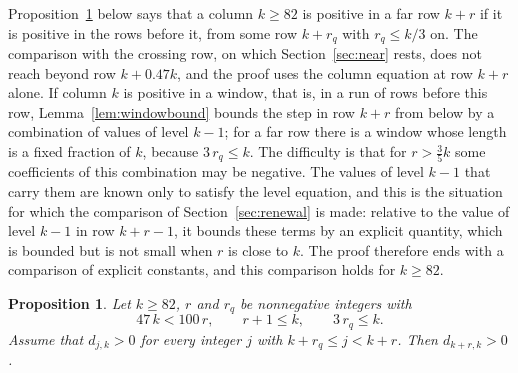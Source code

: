 \documentclass{amsart}
\newtheorem{proposition}[theorem]{Proposition}
\theoremstyle{definition}
\theoremstyle{remark}
\numberwithin{equation}{section}
\begin{document}
Proposition~\ref{prop:farrows} below says that a column $k\ge 82$ is positive in a far row $k+r$ if it is positive in the rows before it, from some row $k+r_q$ with $r_q\le k/3$ on. The comparison with the crossing row, on which Section~\ref{sec:near} rests, does not reach beyond row $k+0.47k$, and the proof uses the column equation at row $k+r$ alone. If column $k$ is positive in a window, that is, in a run of rows before this row, Lemma~\ref{lem:windowbound} bounds the step in row $k+r$ from below by a combination of values of level $k-1$; for a far row there is a window whose length is a fixed fraction of $k$, because $3\,r_q\le k$. The difficulty is that for $r>\frac35k$ some coefficients of this combination may be negative. The values of level $k-1$ that carry them are known only to satisfy the level equation, and this is the situation for which the comparison of Section~\ref{sec:renewal} is made: relative to the value of level $k-1$ in row $k+r-1$, it bounds these terms by an explicit quantity, which is bounded but is not small when $r$ is close to $k$. The proof therefore ends with a comparison of explicit constants, and this comparison holds for $k\ge 82$.

\begin{proposition}\label{prop:farrows}
Let $k\ge 82$, $r$ and $r_q$ be nonnegative integers with
\[
47\,k<100\,r,\qquad r+1\le k,\qquad 3\,r_q\le k .
\]
Assume that $d_{j,k}>0$ for every integer $j$ with $k+r_q\le j<k+r$. Then $d_{k+r,k}>0$.
\end{proposition}
\end{document}
